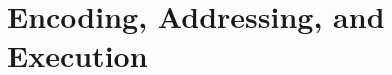 \clearpage
\thispagestyle{empty}
\vspace*{1.45in}
\part{Encoding, Addressing, and Execution}\label{part:encoding-addressing-and-execution}
\vspace*{\fill}
\clearpage
